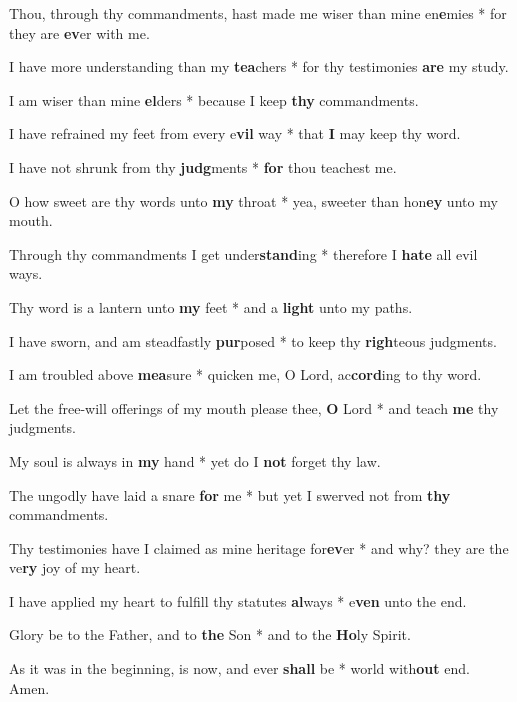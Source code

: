 \begin{multicols}{2}
	Thou, through thy commandments, hast made me wiser than mine en\textbf{e}mies * for they are \textbf{ev}er with me.
	
	I have more understanding than my \textbf{tea}chers * for thy testimonies \textbf{are} my study.
	
	I am wiser than mine \textbf{el}ders * because I keep \textbf{thy} commandments.
	
	I have refrained my feet from every e\textbf{vil} way * that \textbf{I} may keep thy word.
	
	I have not shrunk from thy \textbf{judg}ments * \textbf{for} thou teachest me.
	
	O how sweet are thy words unto \textbf{my} throat * yea, sweeter than hon\textbf{ey} unto my mouth.
	
	Through thy commandments I get under\textbf{stand}ing * therefore I \textbf{hate} all evil ways.
	
	Thy word is a lantern unto \textbf{my} feet * and a \textbf{light} unto my paths.
	
	I have sworn, and am steadfastly \textbf{pur}posed * to keep thy \textbf{righ}teous judgments.
	
	I am troubled above \textbf{mea}sure * quicken me, O Lord, ac\textbf{cord}ing to thy word.
	
	Let the free-will offerings of my mouth please thee, \textbf{O} Lord * and teach \textbf{me} thy judgments.
	
	My soul is always in \textbf{my} hand * yet do I \textbf{not} forget thy law.
	
	The ungodly have laid a snare \textbf{for} me * but yet I swerved not from \textbf{thy} commandments.
	
	Thy testimonies have I claimed as mine heritage for\textbf{ev}er * and why? they are the ve\textbf{ry} joy of my heart.
	
	I have applied my heart to fulfill thy statutes \textbf{al}ways * e\textbf{ven} unto the end.
	
	Glory be to the Father, and to \textbf{the} Son * and to the \textbf{Ho}ly Spirit.
	
	As it was in the beginning, is now, and ever \textbf{shall} be * world with\textbf{out} end. Amen.
\end{multicols}